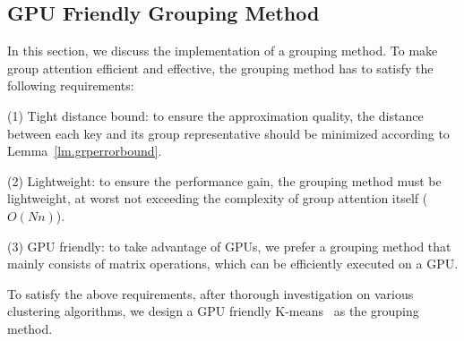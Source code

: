 \begin{sloppypar}

\subsection{GPU Friendly Grouping Method}
In this section, we discuss the implementation of a grouping method. To make group attention efficient and effective, the grouping method has to satisfy the following requirements: 

(1) Tight distance bound: to ensure the approximation quality, the distance between each key and its group representative should be minimized according to Lemma~\ref{lm.grperrorbound}.

(2) Lightweight: to ensure the performance gain, the grouping method must be lightweight, at worst not exceeding the complexity of group attention itself ($O(Nn)$).

(3) GPU friendly: to take advantage of GPUs, we prefer a grouping method that mainly consists of matrix operations, which can be efficiently executed on a GPU.

To satisfy the above requirements, after thorough investigation on various clustering algorithms, we design a GPU friendly K-means~\cite{lloyd1982least} as the grouping method. 


\end{sloppypar}

